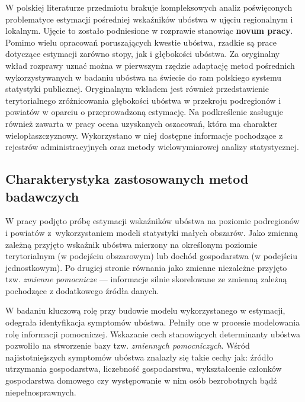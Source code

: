 W polskiej literaturze przedmiotu brakuje kompleksowych analiz poświęconych problematyce estymacji pośredniej wskaźników ubóstwa w ujęciu regionalnym i lokalnym. Ujęcie to zostało podniesione w rozprawie stanowiąc \textbf{novum pracy}. Pomimo wielu opracowań poruszających kwestie ubóstwa, rzadkie są prace dotyczące estymacji zarówno stopy, jak i głębokości ubóstwa. Za oryginalny wkład rozprawy uznać można w pierwszym rzędzie adaptację metod pośrednich wykorzystywanych w badaniu ubóstwa na świecie do ram polskiego systemu statystyki publicznej. Oryginalnym wkładem jest również przedstawienie terytorialnego zróżnicowania głębokości ubóstwa w przekroju podregionów i powiatów w oparciu o przeprowadzoną estymację. Na podkreślenie zasługuje również zawarta w pracy ocena uzyskanych oszacowań, która ma charakter wielopłaszczyznowy. Wykorzystano w niej dostępne informacje pochodzące z rejestrów administracyjnych oraz metody wielowymiarowej analizy statystycznej.

\subsection*{Charakterystyka zastosowanych metod badawczych}

W pracy podjęto próbę estymacji wskaźników ubóstwa na poziomie podregionów i powiatów z~wykorzystaniem modeli statystyki małych obszarów. Jako zmienną zależną przyjęto wskaźnik ubóstwa mierzony na określonym poziomie terytorialnym (w podejściu obszarowym) lub dochód gospodarstwa (w podejściu jednostkowym). Po drugiej stronie równania jako zmienne niezależne przyjęto tzw. \textit{zmienne pomocnicze} --- informacje silnie skorelowane ze zmienną zależną pochodzące z dodatkowego źródła danych.

W badaniu kluczową rolę przy budowie modelu wykorzystanego w estymacji, odegrała identyfikacja symptomów ubóstwa. Pełniły one w procesie modelowania rolę informacji pomocniczej. Wskazanie cech stanowiących determinanty ubóstwa pozwoliło na stworzenie bazy tzw. \textit{zmiennych pomocniczych}. Wśród najistotniejszych symptomów ubóstwa znalazły się takie cechy jak: źródło utrzymania gospodarstwa, liczebność gospodarstwa, wykształcenie członków gospodarstwa domowego czy występowanie w nim osób bezrobotnych bądź niepełnosprawnych.


